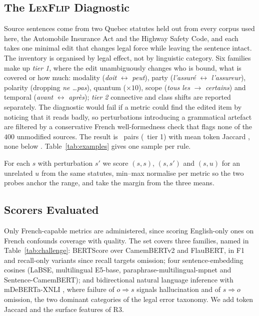 \documentclass{BVP_JCLLT}
\begin{document}
\subsection{The \textsc{LexFlip} Diagnostic}\label{sec:lexflip}

Source sentences come from two Quebec statutes held out from every corpus used
here, the Automobile Insurance Act and the Highway Safety Code, and each takes
one minimal edit that changes legal force while leaving the sentence intact. The
inventory is organised by legal effect, not by linguistic category. Six families
make up \emph{tier 1}, where the edit unambiguously changes who is bound, what
is covered or how much: modality (\emph{doit} $\leftrightarrow$ \emph{peut}),
party (\emph{l'assur\'e} $\leftrightarrow$ \emph{l'assureur}), polarity
(dropping \emph{ne \dots pas}), quantum ($\times 10$), scope (\emph{tous les}
$\rightarrow$ \emph{certains}) and temporal (\emph{avant} $\leftrightarrow$
\emph{apr\`es}); \emph{tier 2} connective and class shifts are reported
separately. The diagnostic would fail if a metric could find the edited item by
noticing that it reads badly, so perturbations introducing a grammatical
artefact are filtered by a conservative French well-formedness check that flags
none of the $400$ unmodified sources. The result is \numedits\ pairs
(\numeditsTierOne\ tier 1) with mean token Jaccard \meanjaccard, none below
\minjaccard. Table~\ref{tab:examples} gives one sample per rule.

For each $s$ with perturbation $s'$ we score $(s,s)$, $(s,s')$ and $(s,u)$ for
an unrelated $u$ from the same statutes, min--max normalise per metric so the
two probes anchor the range, and take the margin from the three means.

\begin{table}
\centering
\caption{\textsc{LexFlip} samples, one per perturbation rule, with the edited
span in bold. Each remains fluent and statutory in register, shares almost all
of its tokens with the original, and states a different rule of
law.}\label{tab:examples}
\small

\end{table}

\subsection{Scorers Evaluated}\label{sec:scorers}

Only French-capable metrics are administered, since scoring English-only ones on
French confounds coverage with quality. The set covers three families, named in
Table~\ref{tab:challenge}: BERTScore \cite{zhang2019bertscore} over CamemBERTv2
and FlauBERT, in F1 and recall-only variants since recall targets omission; four
sentence-embedding cosines (LaBSE, multilingual E5-base,
paraphrase-multilingual-mpnet and Sentence-CamemBERT); and bidirectional natural
language inference with mDeBERTa-XNLI \cite{laurer2024nli}, where failure of
$o \Rightarrow s$ signals hallucination and of $s \Rightarrow o$ omission, the
two dominant categories of the legal error taxonomy. We add token Jaccard and
the surface features of R3.
\end{document}

